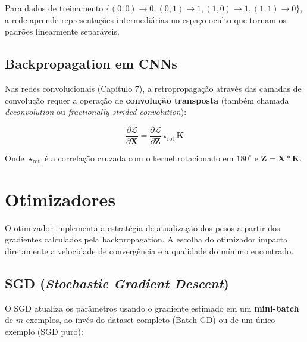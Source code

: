 Para dados de treinamento $\{(0,0)\to0, (0,1)\to1, (1,0)\to1, (1,1)\to0\}$,
a rede aprende representações intermediárias no espaço oculto que tornam os
padrões linearmente separáveis.

\subsection{Backpropagation em CNNs}

Nas redes convolucionais (Capítulo 7), a retropropagação através das camadas
de convolução requer a operação de \textbf{convolução transposta} (também
chamada \textit{deconvolution} ou \textit{fractionally strided convolution}):

\begin{equation}
  \frac{\partial \mathcal{L}}{\partial \mathbf{X}} =
    \frac{\partial \mathcal{L}}{\partial \mathbf{Z}} \star_{\text{rot}} \mathbf{K}
  \label{eq:conv-backward}
\end{equation}

Onde $\star_{\text{rot}}$ é a correlação cruzada com o kernel rotacionado em
$180^\circ$ e $\mathbf{Z} = \mathbf{X} \ast \mathbf{K}$.


\section{Otimizadores}
\label{sec:otimizadores}

O otimizador implementa a estratégia de atualização dos pesos a partir dos
gradientes calculados pela backpropagation. A escolha do otimizador impacta
diretamente a velocidade de convergência e a qualidade do mínimo encontrado.

\subsection{SGD (\textit{Stochastic Gradient Descent})}

O SGD atualiza os parâmetros usando o gradiente estimado em um \textbf{mini-batch}
de $m$ exemplos, ao invés do dataset completo (Batch GD) ou de um único exemplo
(SGD puro):

